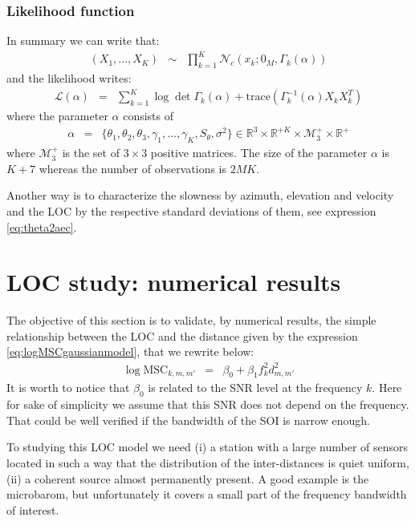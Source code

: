 \documentclass[a4paper, 12pt]{report}
\newcommand{\trace}[1]{\mathrm{trace}\left( #1 \right)}
\def\MSC{\mathrm{MSC}}
\begin{document}
\subsubsection{Likelihood function}
In summary   we can write that:
\begin{eqnarray*}
 (X_{1},\ldots,X_{K}) &\sim&\prod_{k=1}^{K}\mathcal{N}_{c}(x_{k};0_{M},\Gamma_{k}(\alpha))
\end{eqnarray*}
and the likelihood writes:
\begin{eqnarray}
 \label{eq:likelihood-function}
 \mathcal{L}(\alpha)&=&
 \sum_{k=1}^{K}\log\det\Gamma_{k}(\alpha)+\trace{\Gamma_{k}^{-1}(\alpha)X_{k}X_{k}^{T}}
\end{eqnarray}
where the parameter $\alpha$ consists of
\begin{eqnarray}
\alpha&=&
\{
\theta_{1},\theta_{2},\theta_{3},\gamma_{1},\ldots,\gamma_{K},S_{\theta},\sigma^{2}
\}
\in \mathds{R}^{3}\times\mathds{R}^{+K}\times   \mathcal{M}_{3}^{+}\times \mathds{R}^{+}
\end{eqnarray}
where $\mathcal{M}_{3}^{+}$ is the set of $3\times 3$ positive matrices. The size of the parameter $\alpha$ is $K+7$ whereas the number of observations is $2MK$.


Another way is to characterize the slowness by azimuth, elevation and velocity and the LOC by the respective standard deviations of them, see expression \eqref{eq:theta2aec}.
 \section{LOC study: numerical results}
The objective of this section is to validate, by numerical results, the simple relationship between the LOC and the distance given by the expression \eqref{eq:logMSCgaussianmodel}, that we rewrite below:
\begin{eqnarray}
\label{eq:simplemodelMSC}
 \log \MSC_{k,m,m'}&=& \beta_{0}+\beta_{1} f_{k}^2 d_{m,m'}^{2}
\end{eqnarray}
It is worth to notice that $ \beta_{0}$ is related to the SNR level at the frequency $k$. Here for sake of simplicity we assume that this SNR does not depend on the frequency. That could be well verified if the bandwidth of the SOI is narrow enough.

To studying this LOC model we need (i) a  station with a large number of sensors located in such a way that the distribution of the inter-distances is quiet  uniform, (ii) a coherent source almost permanently present. A good example is the microbarom, but unfortunately it covers a small part of the frequency bandwidth of interest. 
\end{document}
